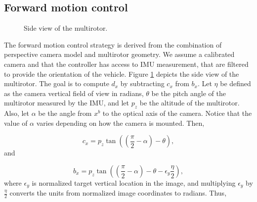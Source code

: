 \documentclass[letterpaper, 10 pt, conference]{ieeeconf}  %
\begin{document}
\subsection{Forward motion control}
\begin{figure}[thpb]
	\centering
	\caption{Side view of the multirotor.}
	\label{side_view}
\end{figure}
The forward motion control strategy is derived from the combination of perspective camera model and multirotor geometry. We assume a calibrated camera and that the controller has access to IMU measurement, that are filtered to provide the orientation of the vehicle. Figure \ref{side_view} depicts the side view of the multirotor. The goal is to compute $d_x$ by subtracting $c_x$ from $b_x$. Let $\eta$ be defined as the camera vertical field of view in radians, $\theta$ be the pitch angle of the multirotor measured by the IMU, and let $p_z$ be the altitude of the multirotor. Also, let $\alpha$ be the angle from $x^b$ to the optical axis of the camera. Notice that the value of $\alpha$ varies depending on how the camera is mounted. Then,

\begin{equation}
c_x=p_z\tan((\frac{\pi}{2}-\alpha)-\theta),
\label{eq4}
\end{equation}
and 

\begin{equation}
b_x=p_z\tan((\frac{\pi}{2}-\alpha)-\theta-\epsilon_y\frac{\eta}{2}),
\label{eq6}
\end{equation} where $\epsilon_y$ is normalized target vertical location in the image, and multiplying $\epsilon_y$ by $\frac{\eta}{2}$ converts the units from normalized image coordinates to radians. Thus, 
\end{document}
